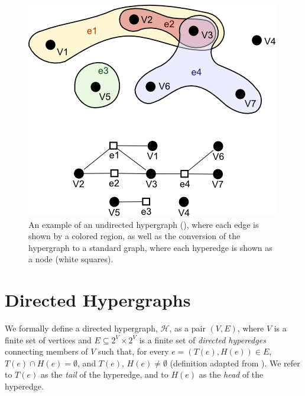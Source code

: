 \documentclass[12pt,twoside]{reedthesis}
\theoremstyle{definition}
\begin{document}
\begin{figure}[h]
  \begin{center}
    \includegraphics[width=\textwidth/2]{undirected_hypergraph}
  \caption[An example undirected hypergraph]{An example of an undirected hypergraph (\cite{sharpen}), where each edge is shown by a colored region, as well as the conversion of the hypergraph to a standard graph, where each hyperedge is shown as a node (white squares).}
  \label{fig:undirected_hypergraph}
  \end{center}
\end{figure}

\section{Directed Hypergraphs}

We formally define a directed hypergraph, $\mathcal{H}$, as a pair $(V,E)$, where $V$ is a finite set of vertices and $E \subseteq 2^V \times 2^V$ is a finite set of \textit{directed hyperedges} connecting members of $V$ such that, for every $e=(T(e),H(e)) \in E$, $T(e) \cap H(e) = \emptyset$, and $T(e)$, $H(e) \neq \emptyset$ (definition adapted from \cite{Gallo1993}).  We refer to $T(e)$ as the \textit{tail} of the hyperedge, and to $H(e)$ as the \textit{head} of the hyperedge.\par
\end{document}
